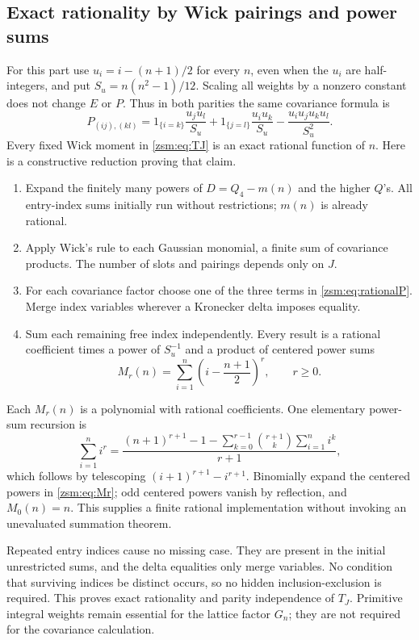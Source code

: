\documentclass[11pt]{article}
\theoremstyle{definition}\newtheorem{definition}[theorem]{Definition}
\theoremstyle{remark}\newtheorem{remark}[theorem]{Remark}
\begin{document}
\subsection{Exact rationality by Wick pairings and power sums}
For this part use $u_i=i-(n+1)/2$ for every $n$, even when the $u_i$ are
half-integers, and put $S_u=n(n^2-1)/12$. Scaling all weights by a nonzero
constant does not change $E$ or $P$. Thus in both parities the same covariance
formula is
\begin{equation}\label{zsm:eq:rationalP}
 P_{(ij),(kl)}=
 1_{\{i=k\}}\frac{u_ju_l}{S_u}
 +1_{\{j=l\}}\frac{u_iu_k}{S_u}
 -\frac{u_iu_ju_ku_l}{S_u^2}.
\end{equation}
Every fixed Wick moment in \eqref{zsm:eq:TJ} is an exact rational function of $n$.
Here is a constructive reduction proving that claim.
\begin{enumerate}
\item Expand the finitely many powers of $D=Q_4-m(n)$ and the higher $Q$'s.
All entry-index sums initially run without restrictions; $m(n)$ is already
rational.
\item Apply Wick's rule to each Gaussian monomial, a finite sum of covariance
products. The number of slots and pairings depends only on $J$.
\item For each covariance factor choose one of the three terms in
\eqref{zsm:eq:rationalP}. Merge index variables wherever a Kronecker delta imposes
equality.
\item Sum each remaining free index independently. Every result is a rational
coefficient times a power of $S_u^{-1}$ and a product of centered power sums
\begin{equation}\label{zsm:eq:Mr}
 M_r(n)=\sum_{i=1}^n\left(i-\frac{n+1}2\right)^r,\qquad r\ge0.
\end{equation}
\end{enumerate}
Each $M_r(n)$ is a polynomial with rational coefficients. One elementary
power-sum recursion is
\[
 \sum_{i=1}^n i^r=
 \frac{(n+1)^{r+1}-1-\sum_{k=0}^{r-1}\binom{r+1}k\sum_{i=1}^n i^k}{r+1},
\]
which follows by telescoping $(i+1)^{r+1}-i^{r+1}$. Binomially expand the
centered powers in \eqref{zsm:eq:Mr}; odd centered powers vanish by reflection,
and $M_0(n)=n$. This supplies a finite rational implementation without invoking
an unevaluated summation theorem.

Repeated entry indices cause no missing case. They are present in the initial
unrestricted sums, and the delta equalities only merge variables. No condition
that surviving indices be distinct occurs, so no hidden inclusion-exclusion
is required. This proves exact rationality and parity independence of $T_J$.
Primitive integral weights remain essential for the lattice factor $G_n$;
they are not required for the covariance calculation.
\end{document}
